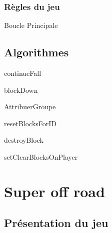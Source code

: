 \documentclass[10pt,dvipsnames,final]{beamer}
\begin{document}
\subsubsection{Règles du jeu}

\begin{frame}[allowframebreaks]{Boucle Principale}

\end{frame}

\subsection{Algorithmes}

\begin{frame}{continueFall}

\end{frame}

\begin{frame}{blockDown}

\end{frame}

\begin{frame}[allowframebreaks]{AttribuerGroupe}

\end{frame}

\begin{frame}{resetBlocksForID}

\end{frame}

\begin{frame}{destroyBlock}

\end{frame}

\begin{frame}{setClearBlocksOnPlayer}

\end{frame}

\section{Super off road}

\subsection{Présentation du jeu}
\end{document}
